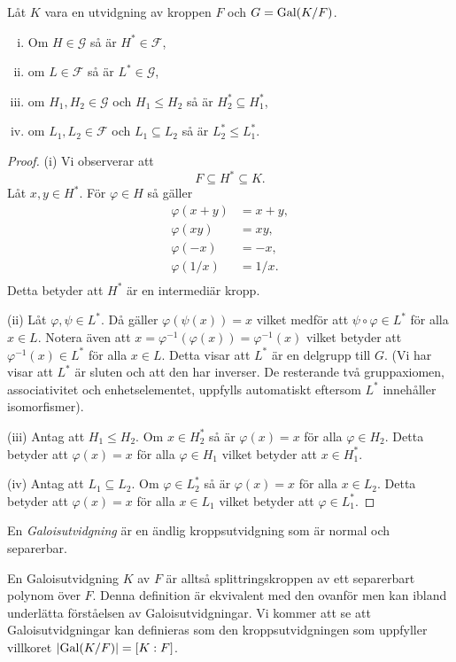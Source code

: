 \documentclass{article}
\newcommand{\gal}[0]{\textnormal{Gal}}
\theoremstyle{definition}
\begin{document}
\hypertarget{lemma9.0.1}{}
\begin{mylemma}{}{}
  Låt $K$ vara en utvidgning av kroppen $F$ och $G = \gal(K/F)$.
  \begin{enumerate}[(i)]
    \item Om $H \in \mathcal{G}$ så är $H^* \in \mathcal{F}$,
    \item om $L \in \mathcal{F}$ så är $L^* \in \mathcal{G}$,
    \item om $H_1, H_2 \in \mathcal{G}$ och $H_1 \leq H_2$ så är $H_2^* \subseteq H_1^*$,
    \item om $L_1, L_2 \in \mathcal{F}$ och $L_1 \subseteq L_2$ så är $L_2^* \leq L_1^*$.
  \end{enumerate}
\end{mylemma}

\begin{proof}
  (i) Vi observerar att 
  \[F \subseteq H^* \subseteq K.\]
  Låt $x, y \in H^*$. För $\varphi \in H$ så gäller 
  \begin{align*}
    \varphi(x + y) &= x + y, \\
    \varphi(xy) &= xy, \\
    \varphi(-x) &= -x, \\
    \varphi(1/x) &= 1/x. \\
  \end{align*}
  Detta betyder att $H^*$ är en intermediär kropp.

  (ii) Låt $\varphi, \psi \in L^*$. Då gäller $\varphi(\psi(x)) = x$ vilket medför att $\psi \circ \varphi \in L^*$ för alla $x \in L$. 
  Notera även att $x = \varphi^{-1}(\varphi(x)) = \varphi^{-1}(x)$ vilket betyder att $\varphi^{-1}(x) \in L^*$ för alla $x \in L$. 
  Detta visar att $L^*$ är en delgrupp till $G$.
  (Vi har visar att $L^*$ är sluten och att den har inverser. De resterande två gruppaxiomen, associativitet och enhetselementet, uppfylls automatiskt
  eftersom $L^*$ innehåller isomorfismer).

  (iii) Antag att $H_1 \leq H_2$. Om $x \in H_2^*$ så är $\varphi(x) = x$ för alla $\varphi \in H_2.$ Detta betyder att $\varphi(x) = x$ för alla $\varphi \in H_1$
  vilket betyder att $x \in H_1^*.$

  (iv) Antag att $L_1 \subseteq L_2$. Om $\varphi \in L_2^*$ så är $\varphi(x) = x$ för alla $x \in L_2$. Detta betyder att $\varphi(x) = x$ för alla $x \in L_1$
  vilket betyder att $\varphi \in L_1^*.$
\end{proof}

\begin{mydef}{}{}
  En \textit{Galoisutvidgning} är en ändlig kroppsutvidgning som är normal och separerbar.
\end{mydef}
En Galoisutvidgning $K$ av $F$ är alltså splittringskroppen av ett separerbart polynom över $F$. Denna 
definition är ekvivalent med den ovanför men kan ibland underlätta förståelsen av Galoisutvidgningar.
Vi kommer att se att Galoisutvidgningar kan definieras som den kroppsutvidgningen som uppfyller 
villkoret $|\gal(K/F)| = [K:F]$.
\end{document}
